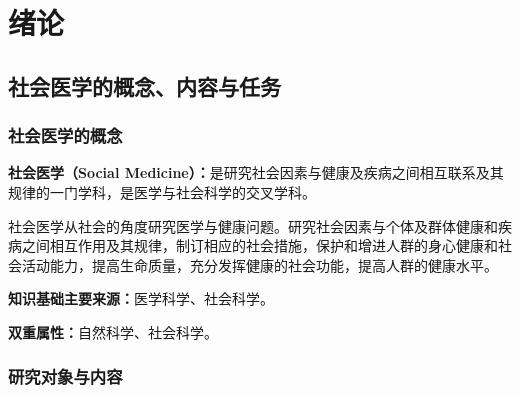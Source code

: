\chapter{绪论}
\setcounter{chapter}{1}

\section{社会医学的概念、内容与任务}

\subsection{社会医学的概念}

\begin{defbox}
\textbf{社会医学（Social Medicine）：}是研究社会因素与健康及疾病之间相互联系及其规律的一门学科，是医学与社会科学的交叉学科。

社会医学从社会的角度研究医学与健康问题。研究社会因素与个体及群体健康和疾病之间相互作用及其规律，制订相应的社会措施，保护和增进人群的身心健康和社会活动能力，提高生命质量，充分发挥健康的社会功能，提高人群的健康水平。

\textbf{知识基础主要来源：}医学科学、社会科学。

\textbf{双重属性：}自然科学、社会科学。
\end{defbox}

\subsection{研究对象与内容}

